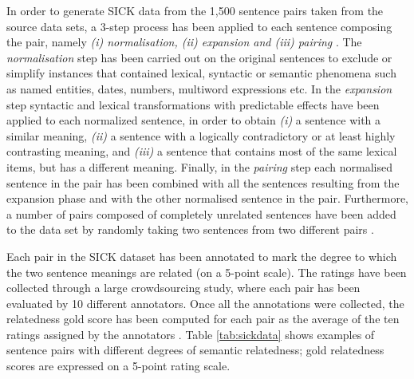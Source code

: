 \begin{enumerate}
  In order to generate SICK data from the 1,500 sentence pairs taken from the source data sets, a 3-step process has been applied to each sentence composing the pair, namely \textit{(i) normalisation, (ii) expansion and (iii) pairing} \cite{marelli-etal-2014-semeval}. The \textit{normalisation} step has been carried out on the original sentences to exclude or simplify instances that contained lexical, syntactic or semantic phenomena such as named entities, dates, numbers, multiword expressions etc. In the \textit{expansion} step syntactic and lexical transformations with predictable effects have been applied to each normalized sentence, in
  order to obtain \textit{(i)} a sentence with a similar meaning, \textit{(ii)} a sentence with a logically contradictory or at least highly contrasting meaning, and \textit{(iii)} a sentence that contains most of the same lexical items, but has a different meaning. Finally, in the \textit{pairing} step each normalised sentence in the pair has been combined with all the sentences resulting from the expansion phase and with the other normalised sentence in the pair. Furthermore, a number of pairs composed of completely unrelated sentences have been added to the data set by randomly taking two sentences from two different pairs \cite{marelli-etal-2014-semeval}. 
  
  Each pair in the SICK dataset has been annotated to mark the degree to which the two sentence meanings are related (on a 5-point scale). The ratings 
  have been collected through a large crowdsourcing study, where each pair 
  has been evaluated by 10 different annotators. Once all the annotations were collected, the relatedness gold score has been computed for each pair as the average of the ten ratings assigned by the annotators \cite{marelli-etal-2014-semeval}. Table \ref{tab:sickdata} shows examples of sentence pairs with different degrees of semantic relatedness; gold relatedness scores are expressed on a 5-point rating scale.
  

\end{enumerate}
